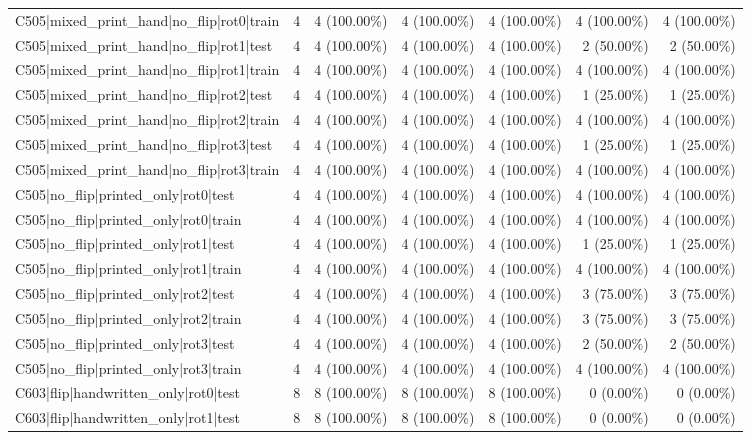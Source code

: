 \begin{longtable}{>{\raggedright\arraybackslash}p{5cm}rrrrrr}
C505|mixed\_print\_hand|no\_flip|rot0|train & 4 & 4 (100.00\%) & 4 (100.00\%) & 4 (100.00\%) & 4 (100.00\%) & 4 (100.00\%) \\
C505|mixed\_print\_hand|no\_flip|rot1|test & 4 & 4 (100.00\%) & 4 (100.00\%) & 4 (100.00\%) & 2 (50.00\%) & 2 (50.00\%) \\
C505|mixed\_print\_hand|no\_flip|rot1|train & 4 & 4 (100.00\%) & 4 (100.00\%) & 4 (100.00\%) & 4 (100.00\%) & 4 (100.00\%) \\
C505|mixed\_print\_hand|no\_flip|rot2|test & 4 & 4 (100.00\%) & 4 (100.00\%) & 4 (100.00\%) & 1 (25.00\%) & 1 (25.00\%) \\
C505|mixed\_print\_hand|no\_flip|rot2|train & 4 & 4 (100.00\%) & 4 (100.00\%) & 4 (100.00\%) & 4 (100.00\%) & 4 (100.00\%) \\
C505|mixed\_print\_hand|no\_flip|rot3|test & 4 & 4 (100.00\%) & 4 (100.00\%) & 4 (100.00\%) & 1 (25.00\%) & 1 (25.00\%) \\
C505|mixed\_print\_hand|no\_flip|rot3|train & 4 & 4 (100.00\%) & 4 (100.00\%) & 4 (100.00\%) & 4 (100.00\%) & 4 (100.00\%) \\
C505|no\_flip|printed\_only|rot0|test & 4 & 4 (100.00\%) & 4 (100.00\%) & 4 (100.00\%) & 4 (100.00\%) & 4 (100.00\%) \\
C505|no\_flip|printed\_only|rot0|train & 4 & 4 (100.00\%) & 4 (100.00\%) & 4 (100.00\%) & 4 (100.00\%) & 4 (100.00\%) \\
C505|no\_flip|printed\_only|rot1|test & 4 & 4 (100.00\%) & 4 (100.00\%) & 4 (100.00\%) & 1 (25.00\%) & 1 (25.00\%) \\
C505|no\_flip|printed\_only|rot1|train & 4 & 4 (100.00\%) & 4 (100.00\%) & 4 (100.00\%) & 4 (100.00\%) & 4 (100.00\%) \\
C505|no\_flip|printed\_only|rot2|test & 4 & 4 (100.00\%) & 4 (100.00\%) & 4 (100.00\%) & 3 (75.00\%) & 3 (75.00\%) \\
C505|no\_flip|printed\_only|rot2|train & 4 & 4 (100.00\%) & 4 (100.00\%) & 4 (100.00\%) & 3 (75.00\%) & 3 (75.00\%) \\
C505|no\_flip|printed\_only|rot3|test & 4 & 4 (100.00\%) & 4 (100.00\%) & 4 (100.00\%) & 2 (50.00\%) & 2 (50.00\%) \\
C505|no\_flip|printed\_only|rot3|train & 4 & 4 (100.00\%) & 4 (100.00\%) & 4 (100.00\%) & 4 (100.00\%) & 4 (100.00\%) \\
C603|flip|handwritten\_only|rot0|test & 8 & 8 (100.00\%) & 8 (100.00\%) & 8 (100.00\%) & 0 (0.00\%) & 0 (0.00\%) \\
C603|flip|handwritten\_only|rot1|test & 8 & 8 (100.00\%) & 8 (100.00\%) & 8 (100.00\%) & 0 (0.00\%) & 0 (0.00\%) \\

\end{longtable}

